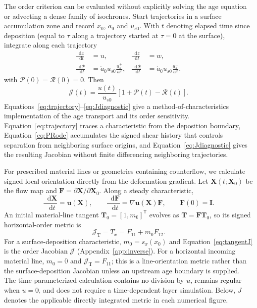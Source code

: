 \documentclass[review]{igs}
\begin{document}
The order criterion can be evaluated without explicitly solving the age equation or advecting a dense family of isochrones. Start trajectories in a surface accumulation zone and record \(x_0\), \(\dot a_0\) and \(u_{s0}\). With \(t\) denoting elapsed time since deposition (equal to \(\tau\) along a trajectory started at \(\tau=0\) at the surface), integrate along each trajectory
\begin{align}
\frac{\mathop{}\!\mathrm{d} x}{\mathop{}\!\mathrm{d} t}&=u,
&
\frac{\mathop{}\!\mathrm{d} z}{\mathop{}\!\mathrm{d} t}&=w,
\label{eq:trajectory}\\
\frac{\mathop{}\!\mathrm{d}\mathcal{P}}{\mathop{}\!\mathrm{d} t}
&=\dot a_0u_{s0}\frac{u_z^+}{u^2},
&
\frac{\mathop{}\!\mathrm{d}\mathcal{R}}{\mathop{}\!\mathrm{d} t}
&=\dot a_0u_{s0}\frac{u_z^-}{u^2},
\label{eq:PRode}
\end{align}
with \(\mathcal{P}(0)=\mathcal{R}(0)=0\). Then
\begin{equation}
\mathcal{J}(t)=\frac{u(t)}{u_{s0}}
\left[1+\mathcal{P}(t)-\mathcal{R}(t)\right].
\label{eq:Jdiagnostic}
\end{equation}
Equations~\ref{eq:trajectory}--\ref{eq:Jdiagnostic} give a method-of-characteristics implementation of the age transport and its order sensitivity. Equation~\ref{eq:trajectory} traces a characteristic from the deposition boundary, Equation~\ref{eq:PRode} accumulates the signed shear history that controls separation from neighboring surface origins, and Equation~\ref{eq:Jdiagnostic} gives the resulting Jacobian without finite differencing neighboring trajectories.

For prescribed material lines or geometries containing counterflow, we calculate signed local orientation directly from the deformation gradient. Let \(\bm{X}(t;\bm{X}_0)\) be the flow map and \(\bm{F}=\partial\bm{X}/\partial\bm{X}_0\). Along a steady characteristic,
\begin{equation}
\frac{\mathop{}\!\mathrm{d}\bm{X}}{\mathop{}\!\mathrm{d}t}=\bm{u}(\bm{X}),
\qquad
\frac{\mathop{}\!\mathrm{d}\bm{F}}{\mathop{}\!\mathrm{d}t}
=\nabla\bm{u}(\bm{X})\bm{F},
\qquad
\bm{F}(0)=\bm{I}.
\label{eq:deformationgradient}
\end{equation}
An initial material-line tangent \(\bm{T}_0=[1,m_0]^{\mathsf T}\) evolves as \(\bm{T}=\bm{F}\bm{T}_0\), so its signed horizontal-order metric is
\begin{equation}
\mathcal{J}_{\mathrm{T}}=T_x=F_{11}+m_0F_{12}.
\label{eq:tangentJ}
\end{equation}
For a surface-deposition characteristic, \(m_0=s_x(x_0)\) and Equation~\ref{eq:tangentJ} is the order Jacobian \(\mathcal{J}\) (Appendix~\ref{app:inverse}). For a horizontal incoming material line, \(m_0=0\) and \(\mathcal{J}_{\mathrm{T}}=F_{11}\); this is a line-orientation metric rather than the surface-deposition Jacobian unless an upstream age boundary is supplied. The time-parameterized calculation contains no division by \(u\), remains regular when \(u=0\), and does not require a time-dependent layer simulation. Below, \(J\) denotes the applicable directly integrated metric in each numerical figure.
\end{document}
